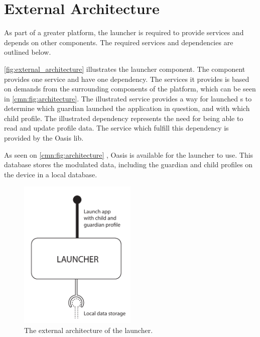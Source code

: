 \chapter{External Architecture}
As part of a greater platform, the launcher is required to provide services and depends on other components. The required services and dependencies are outlined below.

\autoref{fig:external_architecture} illustrates the \giraf[] launcher component. The component provides one service and have one dependency. The services it provides is based on demands from the surrounding components of the \giraf[] platform, which can be seen in \autoref{cmn:fig:architecture}. The illustrated service provides a way for launched \girafapp[]s to determine which guardian launched the application in question, and with which child profile. The illustrated dependency represents the need for being able to read and update profile data. The service which fulfill this dependency is provided by the Oasis lib. 

As seen on \autoref{cmn:fig:architecture} , Oasis is available for the launcher to use. This database stores the modulated data, including the guardian and child profiles on the device in a local database.


\begin{figure}[h]
	\centering
	\includegraphics[width=0.5\textwidth]{gfx/external_launcher_architecture.pdf}
	\caption{The external architecture of the \giraf[] launcher.}
	\label{fig:external_architecture}
\end{figure}


